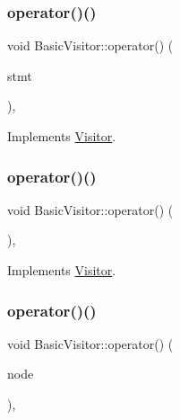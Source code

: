 \subsubsection{\texorpdfstring{operator()()}{operator()()}\hspace{0.1cm}{\footnotesize\ttfamily [39/59]}}
{\footnotesize\ttfamily void Basic\+Visitor\+::operator() (\begin{DoxyParamCaption}\item[{const \hyperlink{struct_try_statement}{Try\+Statement} \&}]{stmt }\end{DoxyParamCaption})\hspace{0.3cm}{\ttfamily [inline]}, {\ttfamily [virtual]}}



Implements \hyperlink{struct_visitor_af65bd8aa26745dea293f06d553d4f46f}{Visitor}.

\mbox{\label{struct_basic_visitor_a643d2e0e4fa076004a987108a455ab5d}} 
\subsubsection{\texorpdfstring{operator()()}{operator()()}\hspace{0.1cm}{\footnotesize\ttfamily [40/59]}}
{\footnotesize\ttfamily void Basic\+Visitor\+::operator() (\begin{DoxyParamCaption}\item[{const \hyperlink{struct_debugger_statement}{Debugger\+Statement} \&}]{ }\end{DoxyParamCaption})\hspace{0.3cm}{\ttfamily [inline]}, {\ttfamily [virtual]}}



Implements \hyperlink{struct_visitor_a7e091bee5a2d416aef22f9b1abd8c7ee}{Visitor}.

\mbox{\label{struct_basic_visitor_a236e03a953fe8f6c29d764ddd0933653}} 
\subsubsection{\texorpdfstring{operator()()}{operator()()}\hspace{0.1cm}{\footnotesize\ttfamily [41/59]}}
{\footnotesize\ttfamily void Basic\+Visitor\+::operator() (\begin{DoxyParamCaption}\item[{const \hyperlink{struct_case_clause}{Case\+Clause} \&}]{node }\end{DoxyParamCaption})\hspace{0.3cm}{\ttfamily [inline]}, {\ttfamily [virtual]}}



